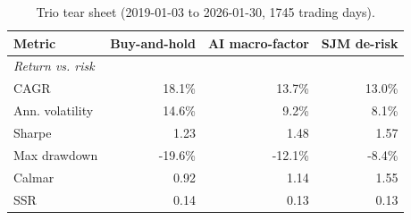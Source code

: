 \begin{table}[htbp]
  \centering
  \caption{Trio tear sheet (2019-01-03 to 2026-01-30, 1745 trading days).}
  \label{tab:tearsheet-paper}
  \begin{tabular}{lrrr}
    \toprule
    Metric & Buy-and-hold & AI macro-factor & SJM de-risk \\
    \midrule
    \multicolumn{4}{l}{\textit{Return vs. risk}} \\
    CAGR & 18.1\% & 13.7\% & 13.0\% \\
    Ann. volatility & 14.6\% & 9.2\% & 8.1\% \\
    Sharpe & 1.23 & 1.48 & 1.57 \\
    Max drawdown & -19.6\% & -12.1\% & -8.4\% \\
    Calmar & 0.92 & 1.14 & 1.55 \\
    SSR & 0.14 & 0.13 & 0.13 \\
    \bottomrule
  \end{tabular}
\end{table}
